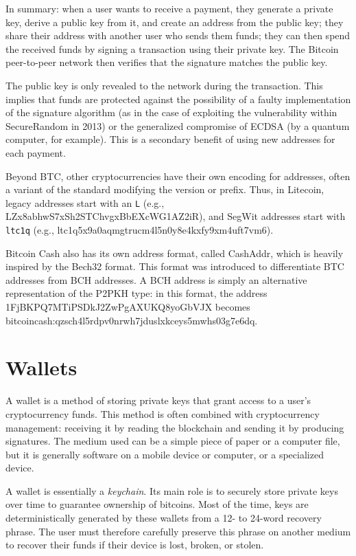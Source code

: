 \documentclass[
  a5paper,
  smalldemyvopaper,10pt,twoside,onecolumn,openright,extrafontsizes,hidelinks]{memoir}
\begin{document}
In summary: when a user wants to receive a payment, they generate a
private key, derive a public key from it, and create an address from the
public key; they share their address with another user who sends them
funds; they can then spend the received funds by signing a transaction
using their private key. The Bitcoin peer-to-peer network then verifies
that the signature matches the public key.

The public key is only revealed to the network during the transaction.
This implies that funds are protected against the possibility of a
faulty implementation of the signature algorithm (as in the case of
exploiting the vulnerability within SecureRandom in 2013) or the
generalized compromise of ECDSA (by a quantum computer, for example).
This is a secondary benefit of using new addresses for each payment.

Beyond BTC, other cryptocurrencies have their own encoding for
addresses, often a variant of the standard modifying the version or
prefix. Thus, in Litecoin, legacy addresses start with an \texttt{L}
(e.g., LZx8abhwS7xSh2STChvgxBbEXcWG1AZ2iR), and SegWit addresses start
with \texttt{ltc1q} (e.g., ltc1q5x9a0aqmgtrucm4l5n0y8e4kxfy9xm4uft7vm6).

Bitcoin Cash also has its own address format, called CashAddr, which is
heavily inspired by the Bech32 format. This format was introduced to
differentiate BTC addresses from BCH addresses. A BCH address is simply
an alternative representation of the P2PKH type: in this format, the
address 1FjBKPQ7MTiPSDkJ2ZwPgAXUKQ8yoGbVJX becomes
bitcoincash:qzsch4l5rdpv0nrwh7jduslxkceys5mwhs03g7e6dq.

\section*{Wallets}\label{wallets}


A wallet is a method of storing private keys that grant access to a
user's cryptocurrency funds. This method is often combined with
cryptocurrency management: receiving it by reading the blockchain and
sending it by producing signatures. The medium used can be a simple
piece of paper or a computer file, but it is generally software on a
mobile device or computer, or a specialized device.

A wallet is essentially a \emph{keychain}. Its main role is to securely
store private keys over time to guarantee ownership of bitcoins. Most of
the time, keys are deterministically generated by these wallets from a
12- to 24-word recovery phrase. The user must therefore carefully
preserve this phrase on another medium to recover their funds if their
device is lost, broken, or stolen.
\end{document}
